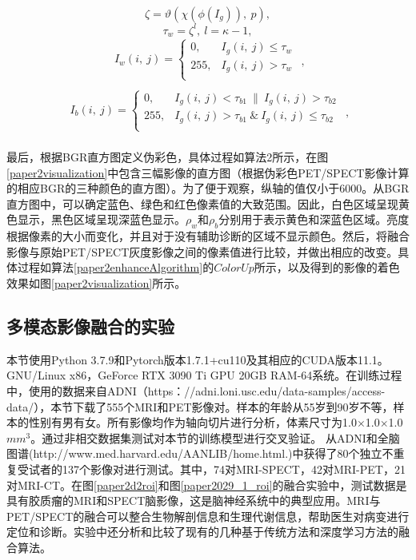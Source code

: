 \begin{equation}\label{paper2Pks}
\zeta =\vartheta\left(\chi\left( \phi \left(I_g\right)\right), ~p\right) ,
\end{equation}
\begin{equation}\label{paper2Tw}
\tau_w =\zeta^{l},~ l=\kappa-1,
\end{equation}
\begin{equation}\label{paper2Ia}
\begin{aligned}
I_{w}(i,~ j)=\begin{cases}
0,  & I_{g}(i,~ j)\le \tau_w\\
255,  & I_{g}(i,~ j)>\tau_w\\
\end{cases} \\
\end{aligned},
\end{equation}
\begin{equation}\label{paper2Ib}
\begin{aligned}
I_{b}(i,~ j)=\begin{cases}
0,  & I_{g}(i,~ j)< \tau_{b1} ~\|~ I_{g}(i,~ j)>\tau_{b2}\\
255,  & I_{g}(i,~ j)>\tau_{b1} ~\&~ I_{g}(i,~ j)\le \tau_{b2}\\
\end{cases} \\
\end{aligned},
\end{equation}


最后，根据BGR直方图定义伪彩色，具体过程如算法2所示，在图\ref{paper2visualization}中包含三幅影像的直方图（根据伪彩色PET/SPECT影像计算的相应BGR的三种颜色的直方图）。为了便于观察，纵轴的值仅小于6000。从BGR直方图中，可以确定蓝色、绿色和红色像素值的大致范围。因此，白色区域呈现黄色显示，黑色区域呈现深蓝色显示。$\rho_w$和$\rho_b$分别用于表示黄色和深蓝色区域。亮度根据像素的大小而变化，并且对于没有辅助诊断的区域不显示颜色。然后，将融合影像与原始PET/SPECT灰度影像之间的像素值进行比较，并做出相应的改变。具体过程如算法\ref{paper2enhanceAlgorithm}的$ColorUp$所示，以及得到的影像的着色效果如图\ref{paper2visualization}所示。


\subsection{多模态影像融合的实验}
本节使用Python 3.7.9和Pytorch版本1.7.1+cu110及其相应的CUDA版本11.1。GNU/Linux x86，GeForce RTX 3090 Ti GPU 20GB RAM-64系统。在训练过程中，使用的数据来自ADNI（https：//adni.loni.usc.edu/data-samples/access-data/），本节下载了555个MRI和PET影像对。样本的年龄从55岁到90岁不等，样本的性别有男有女。所有影像均作为轴向切片进行分析，体素尺寸为1.0$\times$1.0$\times$1.0 $mm^{3}$。通过非相交数据集测试对本节的训练模型进行交叉验证。
从ADNI和全脑图谱(http://www.med.harvard.edu/AANLIB/home.html.)中获得了80个独立不重复受试者的137个影像对进行测试。其中，74对MRI-SPECT，42对MRI-PET，21对MRI-CT。在图\ref{paper2d2roi}和图\ref{paper2029_1_roi}的融合实验中，测试数据是具有胶质瘤的MRI和SPECT脑影像，这是脑神经系统中的典型应用。MRI与PET/SPECT的融合可以整合生物解剖信息和生理代谢信息，帮助医生对病变进行定位和诊断。实验中还分析和比较了现有的几种基于传统方法和深度学习方法的融合算法。


